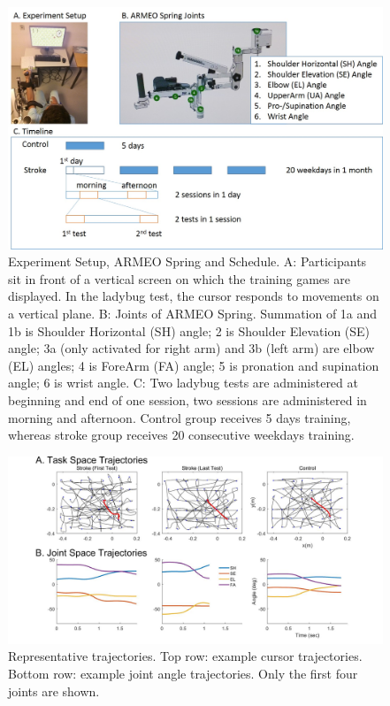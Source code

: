 \begin{figure}
	\centering
	\includegraphics[width=1\linewidth]{figures/1setup&schedule}
	\caption[Experiment Setup and Schedule]
	{Experiment Setup, ARMEO Spring and Schedule. 
		A: Participants sit in front of a vertical screen on which the training games are displayed. In the ladybug test, the cursor responds to movements on a vertical plane. 
		B: Joints of ARMEO Spring. Summation of 1a and 1b is Shoulder Horizontal (SH) angle; 2 is Shoulder Elevation (SE) angle; 3a (only activated for right arm) and 3b (left arm) are elbow (EL) angles; 4 is ForeArm (FA) angle; 5 is pronation and supination angle; 6 is wrist angle.
		C: Two ladybug tests are administered at beginning and end of one session, two sessions are administered in morning and afternoon. Control group receives 5 days training, whereas stroke group receives 20 consecutive weekdays training.}
	\label{fig:1setupschedule}
\end{figure}

\begin{figure}
	\centering
	\includegraphics[width=1\linewidth]{figures/2strokeTrajExamp}
	\caption[Example trajectories]
	{Representative trajectories. 
		Top row: example cursor trajectories.
		Bottom row: example joint angle trajectories. Only the first four joints are shown.}
	\label{fig:2stroketrajexamp}
\end{figure}


